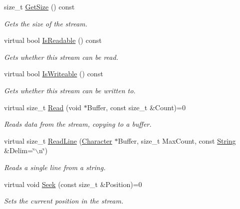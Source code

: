 \begin{DoxyCompactItemize}
size\_\-t \hyperlink{classMezzanine_1_1Resource_1_1DataStream_aa2f840e59423e73557b1c8781ac4ad22}{GetSize} () const 
\begin{DoxyCompactList}\small\item\em Gets the size of the stream. \item\end{DoxyCompactList}\item 
virtual bool \hyperlink{classMezzanine_1_1Resource_1_1DataStream_aaf7a1451e8f097a2294887cf6979940e}{IsReadable} () const 
\begin{DoxyCompactList}\small\item\em Gets whether this stream can be read. \item\end{DoxyCompactList}\item 
virtual bool \hyperlink{classMezzanine_1_1Resource_1_1DataStream_aa01c6819a0cc70e1a7f2988c9381993b}{IsWriteable} () const 
\begin{DoxyCompactList}\small\item\em Gets whether this stream can be written to. \item\end{DoxyCompactList}\item 
virtual size\_\-t \hyperlink{classMezzanine_1_1Resource_1_1DataStream_ad9b597f7d4561a7425b96bb497e6dce2}{Read} (void $\ast$Buffer, const size\_\-t \&Count)=0
\begin{DoxyCompactList}\small\item\em Reads data from the stream, copying to a buffer. \item\end{DoxyCompactList}\item 
virtual size\_\-t \hyperlink{classMezzanine_1_1Resource_1_1DataStream_ae8efbf678f876fb838632a9f7973b2f8}{ReadLine} (\hyperlink{namespaceMezzanine_ad5147a419db7627ee552a2b582f1052d}{Character} $\ast$Buffer, size\_\-t MaxCount, const \hyperlink{namespaceMezzanine_acf9fcc130e6ebf08e3d8491aebcf1c86}{String} \&Delim=\char`\"{}$\backslash$n\char`\"{})
\begin{DoxyCompactList}\small\item\em Reads a single line from a string. \item\end{DoxyCompactList}\item 
virtual void \hyperlink{classMezzanine_1_1Resource_1_1DataStream_a93e869b3f6bb6f8cad75522f01d68e78}{Seek} (const size\_\-t \&Position)=0
\begin{DoxyCompactList}\small\item\em Sets the current position in the stream. \item\end{DoxyCompactList}\item 

\end{DoxyCompactItemize}
